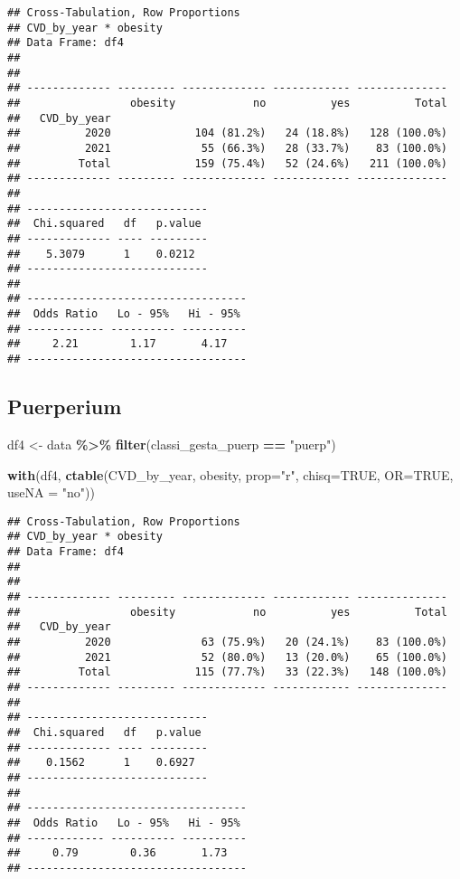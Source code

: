 \documentclass[
]{article}
\newenvironment{Shaded}{\begin{snugshade}}{\end{snugshade}}
\newcommand{\AttributeTok}[1]{\textcolor[rgb]{0.13,0.29,0.53}{#1}}
\newcommand{\ConstantTok}[1]{\textcolor[rgb]{0.56,0.35,0.01}{#1}}
\newcommand{\FunctionTok}[1]{\textcolor[rgb]{0.13,0.29,0.53}{\textbf{#1}}}
\newcommand{\NormalTok}[1]{#1}
\newcommand{\OtherTok}[1]{\textcolor[rgb]{0.56,0.35,0.01}{#1}}
\newcommand{\SpecialCharTok}[1]{\textcolor[rgb]{0.81,0.36,0.00}{\textbf{#1}}}
\newcommand{\StringTok}[1]{\textcolor[rgb]{0.31,0.60,0.02}{#1}}
\begin{document}
\begin{verbatim}
## Cross-Tabulation, Row Proportions  
## CVD_by_year * obesity  
## Data Frame: df4  
## 
## 
## ------------- --------- ------------- ------------ --------------
##                 obesity            no          yes          Total
##   CVD_by_year                                                    
##          2020             104 (81.2%)   24 (18.8%)   128 (100.0%)
##          2021              55 (66.3%)   28 (33.7%)    83 (100.0%)
##         Total             159 (75.4%)   52 (24.6%)   211 (100.0%)
## ------------- --------- ------------- ------------ --------------
## 
## ----------------------------
##  Chi.squared   df   p.value 
## ------------- ---- ---------
##    5.3079      1    0.0212  
## ----------------------------
## 
## ----------------------------------
##  Odds Ratio   Lo - 95%   Hi - 95% 
## ------------ ---------- ----------
##     2.21        1.17       4.17   
## ----------------------------------
\end{verbatim}

\hypertarget{puerperium-5}{%
\subsection{Puerperium}\label{puerperium-5}}

\begin{Shaded}
\begin{Highlighting}[]
\NormalTok{df4 }\OtherTok{\textless{}{-}}\NormalTok{ data }\SpecialCharTok{\%\textgreater{}\%} 
  \FunctionTok{filter}\NormalTok{(classi\_gesta\_puerp }\SpecialCharTok{==} \StringTok{"puerp"}\NormalTok{)}

\FunctionTok{with}\NormalTok{(df4, }\FunctionTok{ctable}\NormalTok{(CVD\_by\_year, obesity, }\AttributeTok{prop=}\StringTok{"r"}\NormalTok{, }\AttributeTok{chisq=}\ConstantTok{TRUE}\NormalTok{, }\AttributeTok{OR=}\ConstantTok{TRUE}\NormalTok{, }\AttributeTok{useNA =} \StringTok{"no"}\NormalTok{))}
\end{Highlighting}
\end{Shaded}

\begin{verbatim}
## Cross-Tabulation, Row Proportions  
## CVD_by_year * obesity  
## Data Frame: df4  
## 
## 
## ------------- --------- ------------- ------------ --------------
##                 obesity            no          yes          Total
##   CVD_by_year                                                    
##          2020              63 (75.9%)   20 (24.1%)    83 (100.0%)
##          2021              52 (80.0%)   13 (20.0%)    65 (100.0%)
##         Total             115 (77.7%)   33 (22.3%)   148 (100.0%)
## ------------- --------- ------------- ------------ --------------
## 
## ----------------------------
##  Chi.squared   df   p.value 
## ------------- ---- ---------
##    0.1562      1    0.6927  
## ----------------------------
## 
## ----------------------------------
##  Odds Ratio   Lo - 95%   Hi - 95% 
## ------------ ---------- ----------
##     0.79        0.36       1.73   
## ----------------------------------
\end{verbatim}
\end{document}
